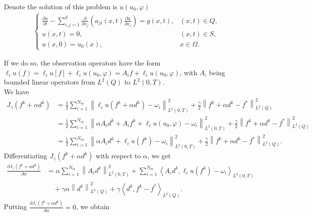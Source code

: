 \documentclass[]{article}
\begin{document}
\begin{bt}\label{bt2.2}
	Denote the solution of this problem is $u(u_0, \varphi)$
	\begin{align*}
		\begin{cases}
			\frac{\partial u}{\partial t}-\sum_{i, j=1}^{d}\frac{\partial}{\partial x_j}\left(a_{ji}(x, t)\frac{\partial u}{\partial x_i}\right)=g(x, t),&(x, t)\in Q,\\
			u(x, t)=0, & (x, t)\in S,\\
			u(x, 0)=u_0(x),&x\in \Omega.
		\end{cases}
	\end{align*}
\end{bt}
\noindent If we do so, the observation operators have the form $\ell_i u(f)=\ell_i u[f]+\ell_i u(u_0, \varphi)=A_if+\ell_i u(u_0, \varphi)$, with $A_i$ being bounded linear operators from $L^2(Q)$ to $L^2(0, T)$.\\
We have
\begin{align*}
	J_{\gamma}(f^k+\alpha d^k)&=\frac{1}{2}\sum_{i=1}^{N_m}\left\|\ell_i u(f^k+\alpha d^k)-\omega_i\right\|_{L^2(0, T)}^2+\frac{\gamma}{2}\left\|f^k+\alpha d^k-f^*\right\|_{L^2(Q)}^2\\[0.2cm]
	&=\frac{1}{2}\sum_{i=1}^{N_m}\left\|\alpha A_id^k+A_if^k+\ell_i u(u_0, \varphi)-\omega_i\right\|_{L^2(0, T)}^2+\frac{\gamma}{2}\left\|f^k+\alpha d^k-f^*\right\|_{L^2(Q)}^2\\[0.2cm]
	&=\frac{1}{2}\sum_{i=1}^{N_m}\left\|\alpha A_id^k+\ell_i u(f^k)-\omega_i\right\|_{L^2(0, T)}^2+\frac{\gamma}{2}\left\|f^k+\alpha d^k-f^*\right\|_{L^2(Q)}^2.
\end{align*}
Differentiating $J_\gamma(f^k+\alpha d^k)$ with respect to $\alpha$, we get
\begin{align*}
	\frac{\partial J_\gamma(f^k+\alpha d^k)}{\partial \alpha} &= \alpha\sum_{i=1}^{N_m}\left\|A_id^k \right\|_{L^2(0, T)}^2+\sum_{i=1}^{N_m}\left\langle A_id^k,\ell_i u(f^k)-\omega_i\right\rangle_{L^2(0, T)}\\[0.2cm]
	&\quad+\gamma\alpha\left\| d^k\right\|_{L^2(Q)}^2+\gamma\left\langle d^k, f^k-f^*\right\rangle_{L^2(Q)}.
\end{align*}
Putting $\frac{\partial J_\gamma(f^k+\alpha d^k)}{\partial \alpha}=0$, we obtain
\end{document}
